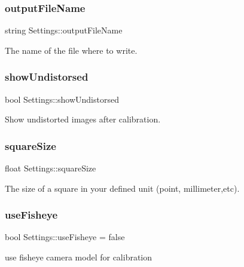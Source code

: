 \subsubsection{\texorpdfstring{output\+File\+Name}{outputFileName}}
{\footnotesize\ttfamily string Settings\+::output\+File\+Name}



The name of the file where to write. 

\mbox{\label{class_settings_a935d6f27ee454e9fee63f8b662f48a06}} 
\subsubsection{\texorpdfstring{show\+Undistorsed}{showUndistorsed}}
{\footnotesize\ttfamily bool Settings\+::show\+Undistorsed}



Show undistorted images after calibration. 

\mbox{\label{class_settings_a6c94708776ad1ce258fc44f2101f5941}} 
\subsubsection{\texorpdfstring{square\+Size}{squareSize}}
{\footnotesize\ttfamily float Settings\+::square\+Size}



The size of a square in your defined unit (point, millimeter,etc). 

\mbox{\label{class_settings_ac8f271630d54f9d0c718ea0130972d44}} 
\subsubsection{\texorpdfstring{use\+Fisheye}{useFisheye}}
{\footnotesize\ttfamily bool Settings\+::use\+Fisheye = false}



use fisheye camera model for calibration 

\mbox{\label{class_settings_a1cee56847e08f49c90d2f7e2b0511197}} 
